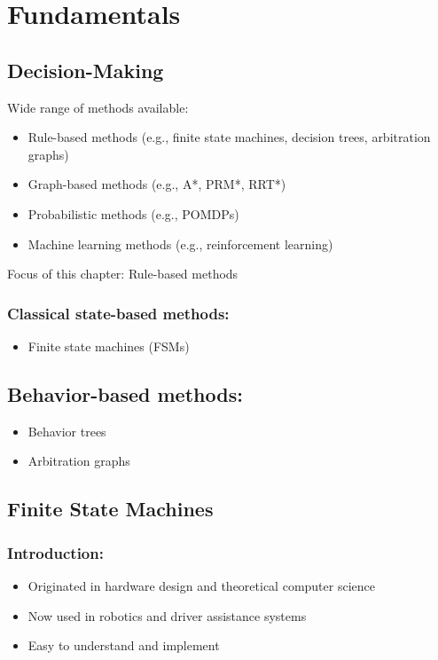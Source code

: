 
\section{Fundamentals}

\subsection{Decision-Making}

Wide range of methods available:
\begin{itemize}
  \item Rule-based methods (e.g., finite state machines, decision trees, arbitration graphs)
  \item Graph-based methods (e.g., A*, PRM*, RRT*)
  \item Probabilistic methods (e.g., POMDPs)
  \item Machine learning methods (e.g., reinforcement learning)
\end{itemize}

Focus of this chapter: Rule-based methods

\subsubsection*{Classical state-based methods:}
\begin{itemize}
  \item Finite state machines (FSMs)
\end{itemize}

\subsection*{Behavior-based methods:}
\begin{itemize}
  \item Behavior trees
  \item Arbitration graphs
\end{itemize}

\subsection{Finite State Machines}

\subsubsection*{Introduction:}
\begin{itemize}
    \item Originated in hardware design and theoretical computer science
    \item Now used in robotics and driver assistance systems
    \item Easy to understand and implement
\end{itemize}

